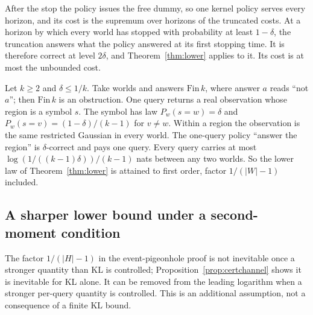 
After the stop the policy issues the free dummy, so one kernel policy serves every horizon, and
its cost is the supremum over horizons of the truncated costs. At a horizon by which every world
has stopped with probability at least $1-\delta$, the truncation answers what the policy answered
at its first stopping time. It is therefore correct at level $2\delta$, and
Theorem~\ref{thm:lower} applies to it. Its cost is at most the unbounded cost.

\begin{proposition}
\label{prop:certchannel}
Let $k\ge2$ and $\delta\le1/k$. Take worlds and answers $\mathrm{Fin}\,k$, where answer $a$ reads
``not $a$''; then $\mathrm{Fin}\,k$ is an obstruction. One query returns a real observation
whose region is a symbol $s$. The symbol has law $P_w(s=w)=\delta$ and
$P_w(s=v)=(1-\delta)/(k-1)$ for $v\ne w$. Within a region the observation is the same restricted
Gaussian in every world. The one-query policy ``answer the region'' is $\delta$-correct and pays
one query. Every query carries at most $\log(1/((k-1)\delta))/(k-1)$ nats between any two
worlds. So the lower law of Theorem~\ref{thm:lower} is attained to first order, factor
$1/(|W|-1)$ included.
\end{proposition}

\subsection{A sharper lower bound under a second-moment condition}
The factor $1/(|H|-1)$ in the event-pigeonhole proof is not inevitable once a stronger
quantity than KL is controlled; Proposition~\ref{prop:certchannel} shows it is inevitable for
KL alone. It can be removed
from the leading logarithm when a stronger per-query quantity is controlled. This is an
additional assumption, not a consequence of a finite KL bound.

